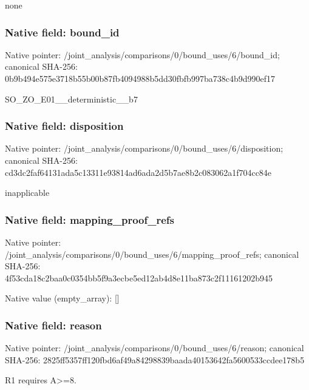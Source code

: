 \documentclass[10pt,a4paper]{article}
\begin{document}
\begingroup\raggedright\sloppy none\par\endgroup

\subsubsection{Native field: bound\_\allowbreak{}id}
Native pointer: /joint\_\allowbreak{}analysis/comparisons/0/bound\_\allowbreak{}uses/6/bound\_\allowbreak{}id; canonical SHA-256: 0b9b494e575e3718b55b00b87fb4094988b5dd30fbfb997ba738c4b9d990ef17

\begingroup\raggedright\sloppy SO\_\allowbreak{}ZO\_\allowbreak{}E01\_\allowbreak{}\_\allowbreak{}deterministic\_\allowbreak{}\_\allowbreak{}b7\par\endgroup

\subsubsection{Native field: disposition}
Native pointer: /joint\_\allowbreak{}analysis/comparisons/0/bound\_\allowbreak{}uses/6/disposition; canonical SHA-256: cd3dc2faf64131ada5c13311e93814ad6ada2d5b7ae8b2c083062a1f704cc84e

\begingroup\raggedright\sloppy inapplicable\par\endgroup

\subsubsection{Native field: mapping\_\allowbreak{}proof\_\allowbreak{}refs}
Native pointer: /joint\_\allowbreak{}analysis/comparisons/0/bound\_\allowbreak{}uses/6/mapping\_\allowbreak{}proof\_\allowbreak{}refs; canonical SHA-256: 4f53cda18c2baa0c0354bb5f9a3ecbe5ed12ab4d8e11ba873c2f11161202b945

Native value (empty\_\allowbreak{}array): []

\subsubsection{Native field: reason}
Native pointer: /joint\_\allowbreak{}analysis/comparisons/0/bound\_\allowbreak{}uses/6/reason; canonical SHA-256: 2825ff5357ff120fbd6af49a84298839baada40153642fa5600533ccdee178b5

\begingroup\raggedright\sloppy R1 requires A>=\allowbreak{}8.\par\endgroup
\end{document}
